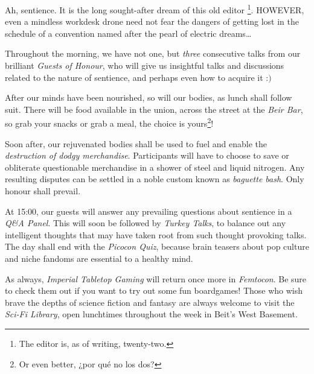 Ah, sentience. It is the long sought-after dream of this old editor \footnote{The editor is, as of writing, twenty-two.}. HOWEVER, even a mindless workdesk drone need not fear the dangers of getting lost in the schedule of a convention named after the pearl of electric dreams…

Throughout the morning, we have not one, but \emph{three} consecutive talks from our brilliant \emph{Guests of Honour}, who will give us insightful talks and discussions related to the nature of sentience, and perhaps even how to acquire it :$)$

After our minds have been nourished, so will our bodies, as lunch shall follow suit. There will be food available in the union, across the street at the \emph{Beir Bar}, so grab your snacks or grab a meal, the choice is yours\footnote{Or even better, ¿por qué no los dos?}!

Soon after, our rejuvenated bodies shall be used to fuel and enable the \emph{destruction of dodgy merchandise}. Participants will have to choose to save or obliterate questionable merchandise in a shower of steel and liquid nitrogen. Any resulting disputes can be settled in a noble custom known as \emph{baguette bash}. Only honour shall prevail. 

At 15:00, our guests will answer any prevailing questions about sentience in a \emph{Q\&A Panel}. This will soon be followed by \emph{Turkey Talks}, to balance out any intelligent thoughts that may have taken root from such thought provoking talks. The day shall end with the \emph{Picocon Quiz}, because brain teasers about pop culture and niche fandoms are essential to a healthy mind. 

As always, \emph{Imperial Tabletop Gaming} will return once more in \emph{Femtocon}. Be sure to check them out if you want to try out some fun boardgames! Those who wish brave the depths of science fiction and fantasy are always welcome to visit the \emph{Sci-Fi Library}, open lunchtimes throughout the week in Beit's West Basement.